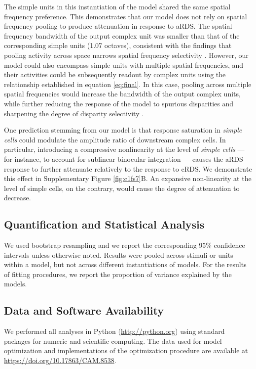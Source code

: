 The simple units in this instantiation of the model shared the same spatial frequency preference. This demonstrates that our model does not rely on spatial frequency pooling to produce attenuation in response to aRDS. The spatial frequency bandwidth of the output complex unit was smaller than that of the corresponding simple units (1.07 octaves), consistent with the findings that pooling activity across space narrows spatial frequency selectivity \cite{Kato:2016fk}. However, our model could also encompass simple units with multiple spatial frequencies, and their activities could be subsequently readout by complex units using the relationship established in equation \ref{eq:final}. In this case, pooling across multiple spatial frequencies would increase the bandwidth of the output complex units, while further reducing the response of the model to spurious disparities \cite{Fleet:1996tq} and sharpening the degree of disparity selectivity \cite{Baba:2015ij,Kato:2016fk}. 

One prediction stemming from our model is that response saturation in \textit{simple cells} could modulate the amplitude ratio of downstream complex cells. In particular, introducing a compressive nonlinearity at the level of \textit{simple cells} --- for instance, to account for sublinear binocular integration \cite{Longordo2013} --- causes the aRDS response to further attenuate relatively to the response to cRDS. We demonstrate this effect in Supplementary Figure \ref{fig:c1fs7}B. An expansive non-linearity at the level of simple cells, on the contrary, would cause the degree of attenuation to decrease.

\subsection*{Quantification and Statistical Analysis}
We used bootstrap resampling and we report the corresponding 95\% confidence intervals unless otherwise noted. Results were pooled across stimuli or units within a model, but not across different instantiations of models. For the results of fitting procedures, we report the proportion of variance explained by the models.

\subsection*{Data and Software Availability}
We performed all analyses in Python (\url{http://python.org}) using standard packages for numeric and scientific computing. The data used for model optimization and implementations of the optimization procedure are available at \url{https://doi.org/10.17863/CAM.8538}.


